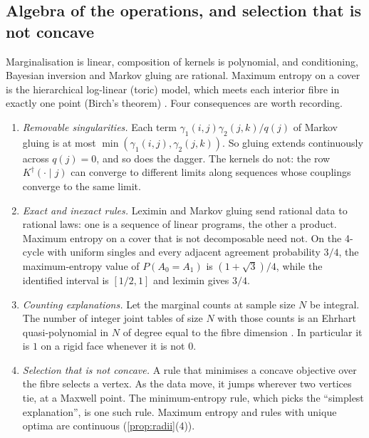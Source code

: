 \documentclass[11pt]{article}
\theoremstyle{definition}\newtheorem{definition}[theorem]{Definition}\newtheorem{remark}[theorem]{Remark}\newtheorem{example}[theorem]{Example}\newtheorem{problem}[theorem]{Open problem}\crefname{problem}{Problem}{Problems}
\begin{document}
\subsection{Algebra of the operations, and selection that is not concave}\label{sec:algsel}
Marginalisation is linear, composition of kernels is polynomial, and conditioning, Bayesian inversion and Markov gluing are rational. Maximum entropy on a cover is the hierarchical log-linear (toric) model, which meets each interior fibre in exactly one point (Birch's theorem) \cite{DrtonSturmfelsSullivant2009}. Four consequences are worth recording.

\begin{proposition}\label{prop:algebra}
\begin{enumerate}
\item[(1)] \emph{Removable singularities.} Each term $\gamma_1(i,j)\gamma_2(j,k)/q(j)$ of Markov gluing is at most $\min(\gamma_1(i,j),\gamma_2(j,k))$. So gluing extends continuously across $q(j)=0$, and so does the dagger. The kernels do not: the row $K^\dagger(\cdot\mid j)$ can converge to different limits along sequences whose couplings converge to the same limit.
\item[(2)] \emph{Exact and inexact rules.} Leximin and Markov gluing send rational data to rational laws: one is a sequence of linear programs, the other a product. Maximum entropy on a cover that is not decomposable need not. On the 4-cycle with uniform singles and every adjacent agreement probability $3/4$, the maximum-entropy value of $P(A_0=A_1)$ is $(1+\sqrt3)/4$, while the identified interval is $[1/2,1]$ and leximin gives $3/4$.
\item[(3)] \emph{Counting explanations.} Let the marginal counts at sample size $N$ be integral. The number of integer joint tables of size $N$ with those counts is an Ehrhart quasi-polynomial in $N$ of degree equal to the fibre dimension \cite{BeckRobins2015}. In particular it is $1$ on a rigid face whenever it is not $0$.
\item[(4)] \emph{Selection that is not concave.} A rule that minimises a concave objective over the fibre selects a vertex. As the data move, it jumps wherever two vertices tie, at a Maxwell point. The minimum-entropy rule, which picks the ``simplest explanation'', is one such rule. Maximum entropy and rules with unique optima are continuous (\cref{prop:radii}(4)).
\end{enumerate}
\end{proposition}
\end{document}
